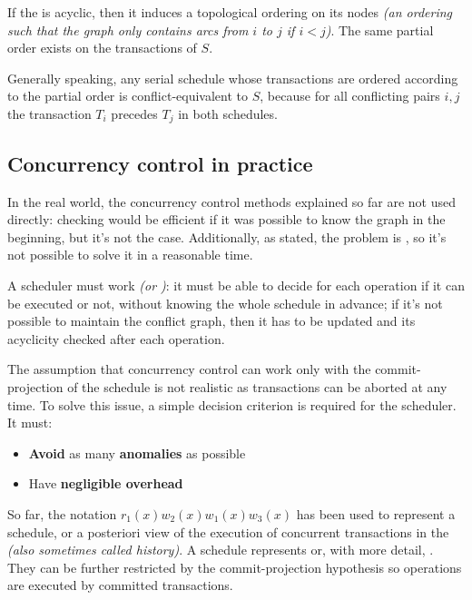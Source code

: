 \documentclass[english]{article}
\begin{document}
If the \cg is acyclic, then it induces a topological ordering on its nodes \textit{(an ordering such that the graph only contains arcs from \(i\) to \(j\) if \(i < j\))}.
The same partial order exists on the transactions of \(S\).

Generally speaking, any serial schedule whose transactions are ordered according to the partial order is conflict-equivalent to \(S\), because for all conflicting pairs \(i, j\) the transaction \(T_i\) precedes \(T_j\) in both schedules.

\subsection{Concurrency control in practice}

In the real world, the concurrency control methods explained so far are not used directly: \csr checking would be efficient if it was possible to know the graph in the beginning, but it's not the case.
Additionally, as stated, the problem is \NPC, so it's not possible to solve it in a reasonable time.

A scheduler must work  \textit{(or )}: it must be able to decide for each operation if it can be executed or not, without knowing the whole schedule in advance;
if it's not possible to maintain the conflict graph, then it has to be updated and its acyclicity checked after each operation.

The assumption that concurrency control can work only with the commit-projection of the schedule is not realistic as transactions can be aborted at any time.
To solve this issue, a simple decision criterion is required for the scheduler.
It must:

\begin{itemize}
  \item \textbf{Avoid} as many \textbf{anomalies} as possible
  \item Have \textbf{negligible overhead}
\end{itemize}

So far, the notation \(r_1(x) w_2(x) w_1(x) w_3(x)\) has been used to represent a schedule, or a posteriori view of the execution of concurrent transactions in the \dbms \textit{(also sometimes called history)}.
A schedule represents  or, with more detail, .
They can be further restricted by the commit-projection hypothesis so operations are executed by committed transactions.
\end{document}

